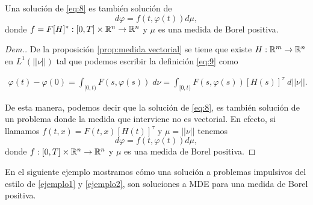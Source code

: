 \begin{thm}\label{thm:m_equivalente}
Una solución de \eqref{eq:8} es también solución de    
\begin{equation}\label{eq:10}
	d\varphi=f(t,\varphi(t))d\mu,
\end{equation} 
donde $f=F[H]^*:[0,T]\times\mathbb{R}^n\to \mathbb{R}^n$ y  $\mu$ es una medida de Borel positiva. 
\end{thm}
\begin{proof}[Dem.]
    De la proposición \eqref{prop:medida vectorial} se tiene que existe $H:\mathbb{R}^m\to\mathbb{R}^n$ en  $L^1(||\nu||)$ tal que  podemos escribir la definición \eqref{eq:9} como 

    
    \begin{equation*}
        \begin{split}
           \varphi(t)-\varphi(0)=\int_{[0,t)}F(s,\varphi(s))\; d\nu=\int_{[0,t)}F(s,\varphi(s))[H(s)]^\tau\; d||\nu||.
        \end{split}
    \end{equation*}



De esta manera, podemos decir que la solución de \eqref{eq:8}, es también solución de un problema donde la medida que interviene no es vectorial. En efecto, si llamamos $f(t,x)=F(t,x)[H(t)]^\tau$ y $\mu=||\nu||$ tenemos 
\begin{equation*}
	d\varphi=f(t,\varphi(t))d\mu,
\end{equation*} 
donde $f:[0,T]\times\mathbb{R}^n\to \mathbb{R}^n$ y  $\mu$ es una medida de Borel positiva.
\end{proof}

En el siguiente ejemplo mostramos cómo una solución a problemas impulsivos del estilo de \ref{ejemplo1} y \ref{ejemplo2}, son soluciones a MDE para una medida de Borel positiva.



